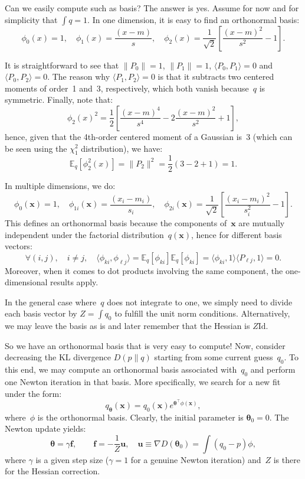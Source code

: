 \documentclass{article}
\def\x{\mathbf{x}}
\def\th{{\boldsymbol{\theta}}}
\def\u{\mathbf{u}}
\def\f{\mathbf{f}}
\def\E{\mathbb{E}}
\begin{document}
Can we easily compute such as basis? The answer is yes. Assume for now and for simplicity that $\int q = 1$. In one dimension, it is easy to find an orthonormal basis:
$$
\phi_0(x) = 1,
\quad \phi_1(x) = \frac{(x-m)}{s},
\quad \phi_2(x) = \frac{1}{\sqrt{2}}\left[\frac{(x-m)^2}{s^2} - 1\right].
$$

It is straightforward to see that $\|P_0\|=1$, $\|P_1\|=1$, $\langle P_0, P_1 \rangle=0$ and $\langle P_0, P_2 \rangle=0$. The reason why $\langle P_1, P_2 \rangle=0$ is that it subtracts two centered moments of order~1 and~3, respectively, which both vanish because~$q$ is symmetric. Finally, note that:
$$
\phi_2(x)^2 = \frac{1}{2} 
\left[\frac{(x-m)^4}{s^4} - 2 \frac{(x-m)^2}{s^2} + 1 \right],
$$
hence, given that the 4th-order centered moment of a Gaussian is~3 (which can be seen using the $\chi_1^2$ distribution), we have:
$$
\E_q [\phi_2^2(x)] = \|P_2\|^2 = \frac{1}{2} (3 - 2 + 1) = 1.
$$

In multiple dimensions, we do:
$$
\phi_0(\x) = 1, 
\quad
\phi_{1i}(\x) = \frac{(x_i-m_i)}{s_i},
\quad
\phi_{2i}(\x) = \frac{1}{\sqrt{2}}\left[\frac{(x_i-m_i)^2}{s_i^2} - 1\right].
$$
This defines an orthonormal basis because the components of~$\x$ are mutually independent under the factorial distribution~$q(\x)$, hence for different basis vectors: 
$$
\forall (i,j), \quad i\not= j, \quad
\langle \phi_{ki}, \phi_{\ell j} \rangle = \E_q[\phi_{ki}]\E_q[\phi_{ki}] = \langle \phi_{ki}, 1 \rangle \langle P_{\ell j}, 1 \rangle = 0.
$$
Moreover, when it comes to dot products involving the same component, the one-dimensional results apply.

In the general case where~$q$ does not integrate to one, we simply need to divide each basis vector by $Z=\int q_0$ to fulfill the unit norm conditions. Alternatively, we may leave the basis as is and later remember that the Hessian is $Z\text{Id}$.

So we have an orthonormal basis that is very easy to compute! Now, consider decreasing the KL divergence $D(p\|q)$ starting from some current guess~$q_0$. To this end, we may compute an orthonormal basis associated with~$q_0$ and perform one Newton iteration in that basis. More specifically, we search for a new fit under the form:
$$
q_\th(\x) = q_0(\x) e^{\th^\top \phi(\x)},
$$
where~$\phi$ is the orthonormal basis. Clearly, the initial parameter is $\th_0=0$. The Newton update yields:
$$
\th = \gamma \f,
\qquad
\f = -\frac{1}{Z} \u,
\quad
\u \equiv \nabla D(\th_0) = \int (q_0 - p)\phi,
$$
where $\gamma$ is a given step size ($\gamma=1$ for a genuine Newton iteration) and~$Z$ is there for the Hessian correction. 
\end{document}
